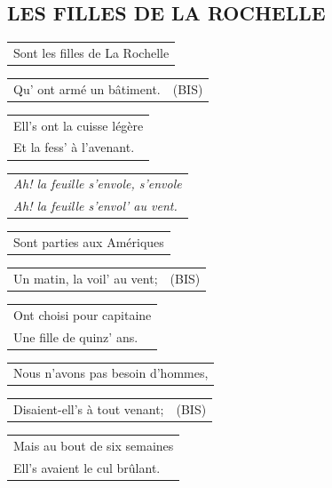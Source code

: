 \documentclass[a4paper, 14pt]{extarticle}
\begin{document}
\subsection*{LES FILLES DE LA ROCHELLE}
\begin{flushleft}
\begin{tabularx}{\textwidth} {
    >{\raggedright\arraybackslash}X}
Sont les filles de La Rochelle\\
\end{tabularx}
\begin{tabularx}{\textwidth} {
    >{\raggedright\arraybackslash}X|c}
Qu’ ont armé un bâtiment. & (BIS)\\
\end{tabularx}
\begin{tabularx}{\textwidth} {
    >{\raggedright\arraybackslash}X}
Ell’s ont la cuisse légère \\
Et la fess’ à l’avenant.\\
\end{tabularx}
\end{flushleft}
\begin{flushleft}
\begin{tabularx}{\textwidth} {
    >{\raggedright\arraybackslash}X}
\textit{Ah! la feuille s’envole, s’envole}\\
\textit{Ah! la feuille s’envol’ au vent.}\\
\end{tabularx}
\end{flushleft}
\begin{flushleft}
\begin{tabularx}{\textwidth} {
    >{\raggedright\arraybackslash}X}
Sont parties aux Amériques\\
\end{tabularx}
\begin{tabularx}{\textwidth} {
    >{\raggedright\arraybackslash}X|c}
Un matin, la voil’ au vent; & (BIS)\\
\end{tabularx}
\begin{tabularx}{\textwidth} {
    >{\raggedright\arraybackslash}X}
Ont choisi pour capitaine \\
Une fille de quinz’ ans.\\
\end{tabularx}
\end{flushleft}
\begin{flushleft}
\begin{tabularx}{\textwidth} {
    >{\raggedright\arraybackslash}X}
Nous n’avons pas besoin d’hommes,\\
\end{tabularx}
\begin{tabularx}{\textwidth} {
    >{\raggedright\arraybackslash}X|c}
Disaient-ell’s à tout venant; & (BIS)\\
\end{tabularx}
\begin{tabularx}{\textwidth} {
    >{\raggedright\arraybackslash}X}
Mais au bout de six semaines \\
Ell’s avaient le cul brûlant.\\
\end{tabularx}
\end{flushleft}
\end{document}
